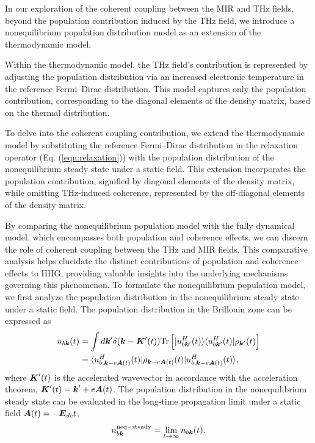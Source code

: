 In our exploration of the coherent coupling between the MIR and THz fields, beyond the population contribution induced by the THz field, we introduce a nonequilibrium population distribution model as an extension of the thermodynamic model.

Within the thermodynamic model, the THz field's contribution is represented by adjusting the population distribution via an increased electronic temperature in the reference Fermi--Dirac distribution. This model captures only the population contribution, corresponding to the diagonal elements of the density matrix, based on the thermal distribution.

To delve into the coherent coupling contribution, we extend the thermodynamic model by substituting the reference Fermi--Dirac distribution in the relaxation operator (Eq. (\ref{eqn:relaxation})) with the population distribution of the nonequilibrium steady state under a static field. This extension incorporates the population contribution, signified by diagonal elements of the density matrix, while omitting THz-induced coherence, represented by the off-diagonal elements of the density matrix.

By comparing the nonequilibrium population model with the fully dynamical model, which encompasses both population and coherence effects, we can discern the role of coherent coupling between the THz and MIR fields. This comparative analysis helps elucidate the distinct contributions of population and coherence effects to HHG, providing valuable insights into the underlying mechanisms governing this phenomenon.
To formulate the nonequilibrium population model, we first analyze the population distribution in the nonequilibrium steady state under a static field. The population distribution in the Brillouin zone can be expressed as
\begin{align}
n_{b \boldsymbol k}(t) & = \int d \boldsymbol k' \delta(\boldsymbol k - \boldsymbol K'(t)) \mathrm{Tr}\left [
| u^H_{b\boldsymbol k'}(t)\rangle \langle u^H_{b\boldsymbol k'}(t)| \rho_{\boldsymbol k'}(t) 
\right ] \nonumber \\
&=\langle u^H_{b,\boldsymbol k-e\boldsymbol A(t)}(t)| \rho_{\boldsymbol k-e\boldsymbol A(t)}(t) 
| u^H_{b,\boldsymbol k-e\boldsymbol A(t)}(t)\rangle,
\end{align}
where $\boldsymbol K'(t)$ is the accelerated wavevector in accordance with the acceleration theorem, $\boldsymbol K'(t)=\boldsymbol k'+e\boldsymbol A(t)$. The population distribution in the nonequilibrium steady state can be evaluated in the long-time propagation limit under a static field $\boldsymbol A(t)= -\boldsymbol E_{dc}t$,
\begin{align}
n^{\mathrm{neq-steady}}_{b\boldsymbol k} = \lim _{t\rightarrow \infty } n_{b \boldsymbol k}(t).
\end{align}

